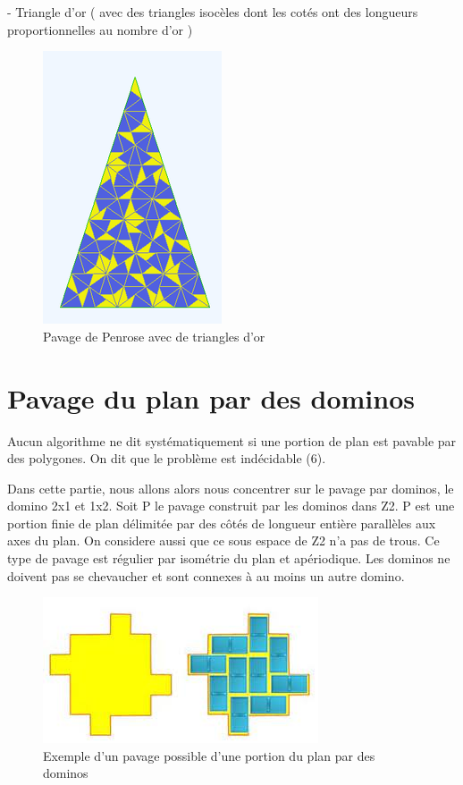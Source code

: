 \documentclass{article}
\begin{document}
- Triangle d’or ( avec des triangles isocèles dont les cotés ont des longueurs proportionnelles au nombre d’or )

\begin{figure} [h]
    \center
    \includegraphics [scale=0.5] {image/penrose_tri.png}
    \caption{Pavage de Penrose avec de triangles d'or}
\end{figure}


\section{Pavage du plan par des dominos}

Aucun algorithme ne dit systématiquement si une portion de plan est pavable par des polygones.
On dit que le problème est indécidable (6).

Dans cette partie, nous allons alors nous concentrer sur le pavage par dominos, le domino 2x1 et 1x2.
Soit P le pavage construit par les dominos dans Z2. P est une portion finie de plan délimitée par des côtés de longueur entière parallèles aux axes du plan.
On considere aussi que ce sous espace de Z2 n’a pas de trous. Ce type de pavage est régulier par isométrie du plan et apériodique.
Les dominos ne doivent pas se chevaucher et sont connexes à au moins un autre domino.

\begin{figure} [h]
    \center
    \includegraphics [scale=0.5] {image/pavage_domino.jpg}
    \caption{Exemple d'un pavage possible d'une portion du plan par des dominos }
\end{figure}
\end{document}
